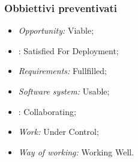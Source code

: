 \subsubsection{Obbiettivi preventivati}
\begin{itemize}
\item \textit{Opportunity:} Viable;
\item {}: Satisfied For Deployment;
\item \textit{Requirements:} Fullfilled;
\item \textit{Software system:} Usable;
\item {}: Collaborating;
\item \textit{Work:} Under Control;
\item \textit{Way of working:} Working Well.
\end{itemize}
